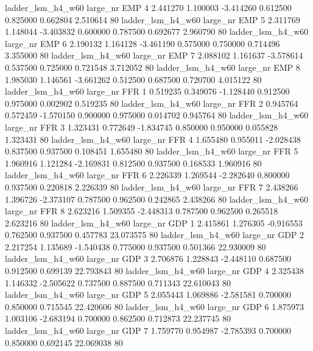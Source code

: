   ladder_lsm_h4_w60   large_nr      EMP                 4  2.441270  1.100003  -3.414260 0.612500 0.825000  0.662804    2.510614 80
  ladder_lsm_h4_w60   large_nr      EMP                 5  2.311769  1.148044  -3.403832 0.600000 0.787500  0.692677    2.960790 80
  ladder_lsm_h4_w60   large_nr      EMP                 6  2.190132  1.164128  -3.461190 0.575000 0.750000  0.714496    3.355000 80
  ladder_lsm_h4_w60   large_nr      EMP                 7  2.088102  1.161637  -3.578614 0.537500 0.725000  0.721548    3.712052 80
  ladder_lsm_h4_w60   large_nr      EMP                 8  1.985030  1.146561  -3.661262 0.512500 0.687500  0.720700    4.015122 80
  ladder_lsm_h4_w60   large_nr      FFR                 1  0.519235  0.349076  -1.128440 0.912500 0.975000  0.002902    0.519235 80
  ladder_lsm_h4_w60   large_nr      FFR                 2  0.945764  0.572459  -1.570150 0.900000 0.975000  0.014702    0.945764 80
  ladder_lsm_h4_w60   large_nr      FFR                 3  1.323431  0.772649  -1.834745 0.850000 0.950000  0.055828    1.323431 80
  ladder_lsm_h4_w60   large_nr      FFR                 4  1.655480  0.955011  -2.028438 0.837500 0.937500  0.108451    1.655480 80
  ladder_lsm_h4_w60   large_nr      FFR                 5  1.960916  1.121284  -2.169831 0.812500 0.937500  0.168533    1.960916 80
  ladder_lsm_h4_w60   large_nr      FFR                 6  2.226339  1.269544  -2.282640 0.800000 0.937500  0.220818    2.226339 80
  ladder_lsm_h4_w60   large_nr      FFR                 7  2.438266  1.396726  -2.373107 0.787500 0.962500  0.242865    2.438266 80
  ladder_lsm_h4_w60   large_nr      FFR                 8  2.623216  1.509355  -2.448313 0.787500 0.962500  0.265518    2.623216 80
  ladder_lsm_h4_w60   large_nr      GDP                 1  2.415861  1.276305  -0.916553 0.762500 0.937500  0.457783   23.073575 80
  ladder_lsm_h4_w60   large_nr      GDP                 2  2.217254  1.135689  -1.540438 0.775000 0.937500  0.501366   22.930009 80
  ladder_lsm_h4_w60   large_nr      GDP                 3  2.706876  1.228843  -2.448110 0.687500 0.912500  0.699139   22.793843 80
  ladder_lsm_h4_w60   large_nr      GDP                 4  2.325438  1.146332  -2.505622 0.737500 0.887500  0.711343   22.610043 80
  ladder_lsm_h4_w60   large_nr      GDP                 5  2.055443  1.069886  -2.581581 0.700000 0.850000  0.715545   22.420606 80
  ladder_lsm_h4_w60   large_nr      GDP                 6  1.875973  1.003106  -2.683194 0.700000 0.862500  0.712873   22.237745 80
  ladder_lsm_h4_w60   large_nr      GDP                 7  1.759770  0.954987  -2.785393 0.700000 0.850000  0.692145   22.069038 80
